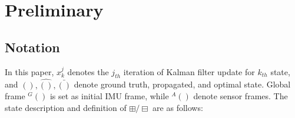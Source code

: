 
\section{Preliminary}
\label{sec:method}

\subsection{Notation}
\label{subsec: Notation}
In this paper, $x_k^j$ denotes the $j_{th}$ iteration of Kalman filter update for $k_{th}$ state, and $(), \widehat{()}, \bar{()}$ denote ground truth, propagated, and optimal state. Global frame ${}^G()$ is set as initial \ac{IMU} frame, while ${}^A()$ denote sensor frames. The state description and definition of $\boxplus/\boxminus$ are as follows:


